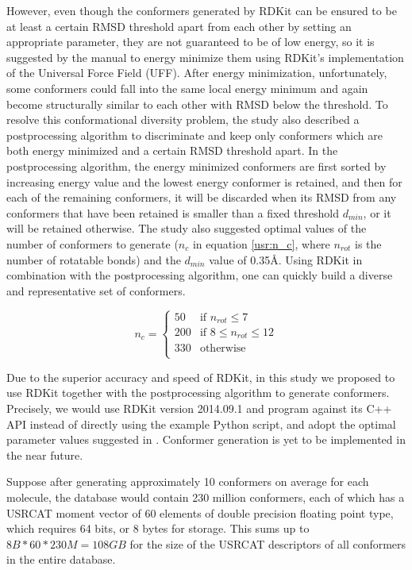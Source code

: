 However, even though the conformers generated by RDKit can be ensured to be at least a certain RMSD threshold apart from each other by setting an appropriate parameter, they are not guaranteed to be of low energy, so it is suggested by the manual to energy minimize them using RDKit's implementation of the Universal Force Field (UFF). After energy minimization, unfortunately, some conformers could fall into the same local energy minimum and again become structurally similar to each other with RMSD below the threshold. To resolve this conformational diversity problem, the study \citep{1127} also described a postprocessing algorithm to discriminate and keep only conformers which are both energy minimized and a certain RMSD threshold apart. In the postprocessing algorithm, the energy minimized conformers are first sorted by increasing energy value and the lowest energy conformer is retained, and then for each of the remaining conformers, it will be discarded when its RMSD from any conformers that have been retained is smaller than a fixed threshold $d_{min}$, or it will be retained otherwise. The study \citep{1127} also suggested optimal values of the number of conformers to generate ($n_c$ in equation \eqref{usr:n_c}, where $n_{rot}$ is the number of rotatable bonds) and the $d_{min}$ value of 0.35\AA. Using RDKit in combination with the postprocessing algorithm, one can quickly build a diverse and representative set of conformers.

\begin{equation}
n_c=
\begin{cases}
 50 & \text{if } n_{rot} \leq 7\\
200 & \text{if } 8 \leq n_{rot} \leq 12\\
330 & \text{otherwise}\\
\end{cases}
\label{usr:n_c}
\end{equation}

Due to the superior accuracy and speed of RDKit, in this study we proposed to use RDKit together with the postprocessing algorithm to generate conformers. Precisely, we would use RDKit version 2014.09.1 and program against its C++ API instead of directly using the example Python script, and adopt the optimal parameter values suggested in \citep{1127}. Conformer generation is yet to be implemented in the near future.%

Suppose after generating approximately 10 conformers on average for each molecule, the database would contain 230 million conformers, each of which has a USRCAT moment vector of 60 elements of double precision floating point type, which requires 64 bits, or 8 bytes for storage. This sums up to $8B*60*230M=108GB$ for the size of the USRCAT descriptors of all conformers in the entire database.

